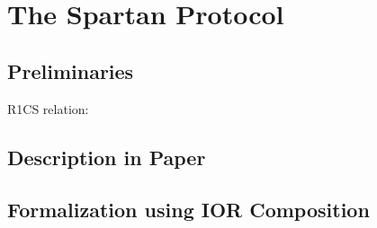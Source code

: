 \section{The Spartan Protocol}\label{sec:spartan}

\subsection{Preliminaries}

R1CS relation:



\subsection{Description in Paper}

\subsection{Formalization using IOR Composition}
